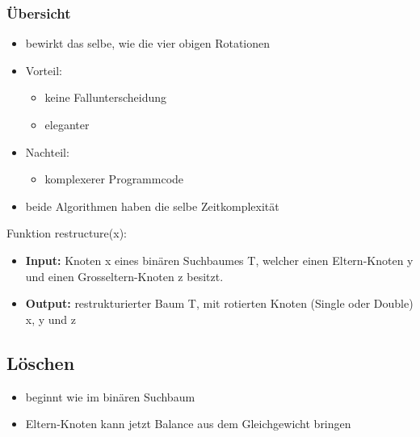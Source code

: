 \subsubsection{Übersicht}
\begin{itemize}
    \item bewirkt das selbe, wie die vier obigen Rotationen
    \item Vorteil:
    \begin{itemize}
        \item keine Fallunterscheidung
        \item eleganter
    \end{itemize}
    \item Nachteil:
    \begin{itemize}
        \item komplexerer Programmcode
    \end{itemize}
    \item beide Algorithmen haben die selbe Zeitkomplexität
\end{itemize}

Funktion restructure(x):
\begin{itemize}
    \item \textbf{Input:} Knoten x eines binären Suchbaumes T, welcher einen Eltern-Knoten y und einen Grosseltern-Knoten z besitzt.
    \item \textbf{Output:} restrukturierter Baum T, mit rotierten Knoten (Single oder Double) x, y und z
\end{itemize}



\subsection{Löschen}
\begin{itemize}
    \item beginnt wie im binären Suchbaum
    \item Eltern-Knoten kann jetzt Balance aus dem Gleichgewicht bringen
\end{itemize}
